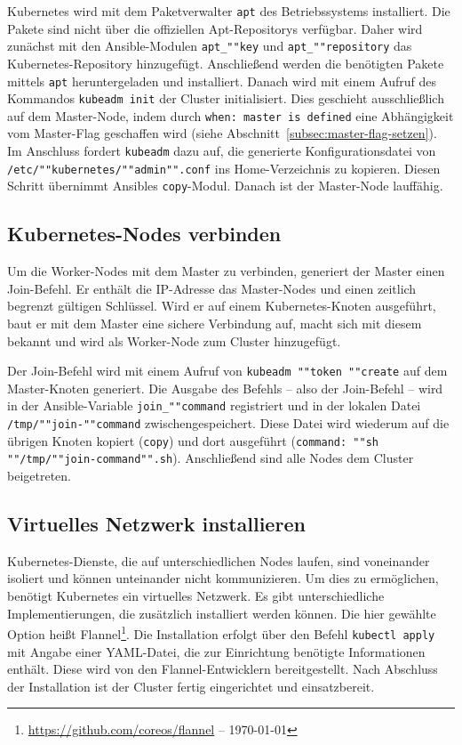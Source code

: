 Kubernetes wird mit dem Paketverwalter \texttt{apt} des Betriebssystems installiert.
Die Pakete sind nicht über die offiziellen Apt-Repositorys verfügbar.
Daher wird zunächst mit den Ansible-Modulen \texttt{apt\_""key} und \texttt{apt\_""repository} das Kubernetes-Repository hinzugefügt.
Anschließend werden die benötigten Pakete mittels \texttt{apt} heruntergeladen und installiert.
Danach wird mit einem Aufruf des Kommandos \texttt{kubeadm init} der Cluster initialisiert.
Dies geschieht ausschließlich auf dem Master-Node, indem durch \texttt{when: master is defined} eine Abhängigkeit vom Master-Flag geschaffen wird (siehe Abschnitt~\ref{subsec:master-flag-setzen}).
Im Anschluss fordert \texttt{kubeadm} dazu auf, die generierte Konfigurationsdatei von \texttt{/etc/""kubernetes/""admin"".conf} ins Home-Verzeichnis zu kopieren.
Diesen Schritt übernimmt Ansibles \texttt{copy}-Modul.
Danach ist der Master-Node lauffähig.

\subsection{Kubernetes-Nodes verbinden}\label{subsec:kubernetes-nodes-verbinden}

Um die Worker-Nodes mit dem Master zu verbinden, generiert der Master einen Join-Befehl.
Er enthält die IP-Adresse das Master-Nodes und einen zeitlich begrenzt gültigen Schlüssel.
Wird er auf einem Kubernetes-Knoten ausgeführt, baut er mit dem Master eine sichere Verbindung auf, macht sich mit diesem bekannt und wird als Worker-Node zum Cluster hinzugefügt.

Der Join-Befehl wird mit einem Aufruf von \texttt{kubeadm ""token ""create} auf dem Master-Knoten generiert.
Die Ausgabe des Befehls -- also der Join-Befehl -- wird in der Ansible-Variable \texttt{join\_""command} registriert und in der lokalen Datei \texttt{/tmp/""join-""command} zwischengespeichert.
Diese Datei wird wiederum auf die übrigen Knoten kopiert (\texttt{copy}) und dort ausgeführt (\texttt{command: ""sh ""/tmp/""join-command"".sh}).
Anschließend sind alle Nodes dem Cluster beigetreten.

\subsection{Virtuelles Netzwerk installieren}

Kubernetes-Dienste, die auf unterschiedlichen Nodes laufen, sind voneinander isoliert und können unteinander nicht kommunizieren.
Um dies zu ermöglichen, benötigt Kubernetes ein virtuelles Netzwerk.
Es gibt unterschiedliche Implementierungen, die zusätzlich installiert werden können.
Die hier gewählte Option heißt Flannel\footnote{\url{https://github.com/coreos/flannel} -- \today}.
Die Installation erfolgt über den Befehl \texttt{kubectl apply} mit Angabe einer YAML-Datei, die zur Einrichtung benötigte Informationen enthält.
Diese wird von den Flannel-Entwicklern bereitgestellt.
Nach Abschluss der Installation ist der Cluster fertig eingerichtet und einsatzbereit.

